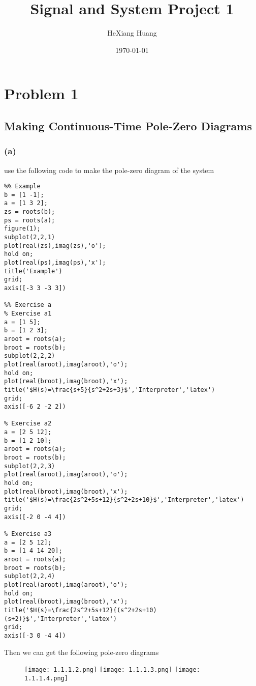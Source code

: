 \documentclass{article}
\begin{document}
\graphicspath{{F:/School/大二下/信号与系统/project/project 1/asset}}
\title{Signal and System Project 1}
\author{HeXiang Huang}
\date{\today}
\maketitle

\tableofcontents

\newpage

\section{Problem 1}
\subsection{Making Continuous-Time Pole-Zero Diagrams}
\subsubsection*{(a)}
use the following code to make the pole-zero diagram of the system
\begin{lstlisting}
%% Example
b = [1 -1];
a = [1 3 2];
zs = roots(b);
ps = roots(a);
figure(1);
subplot(2,2,1)
plot(real(zs),imag(zs),'o');
hold on;
plot(real(ps),imag(ps),'x');
title('Example')
grid;
axis([-3 3 -3 3])

%% Exercise a
% Exercise a1
a = [1 5];
b = [1 2 3];
aroot = roots(a);
broot = roots(b);
subplot(2,2,2)
plot(real(aroot),imag(aroot),'o');
hold on;
plot(real(broot),imag(broot),'x');
title('$H(s)=\frac{s+5}{s^2+2s+3}$','Interpreter','latex')
grid;
axis([-6 2 -2 2])

% Exercise a2
a = [2 5 12];
b = [1 2 10];
aroot = roots(a);
broot = roots(b);
subplot(2,2,3)
plot(real(aroot),imag(aroot),'o');
hold on;
plot(real(broot),imag(broot),'x');
title('$H(s)=\frac{2s^2+5s+12}{s^2+2s+10}$','Interpreter','latex')
grid;
axis([-2 0 -4 4])

% Exercise a3
a = [2 5 12];
b = [1 4 14 20];
aroot = roots(a);
broot = roots(b);
subplot(2,2,4)
plot(real(aroot),imag(aroot),'o');
hold on;
plot(real(broot),imag(broot),'x');
title('$H(s)=\frac{2s^2+5s+12}{(s^2+2s+10)(s+2)}$','Interpreter','latex')
grid;
axis([-3 0 -4 4])
\end{lstlisting}
Then we can get the following pole-zero diagrams
\begin{figure}[h]
    \texttt{[image: 1.1.1.2.png]}
    \texttt{[image: 1.1.1.3.png]}
    \texttt{[image: 1.1.1.4.png]}
\end{figure}
\end{document}
